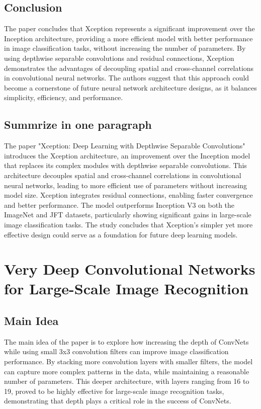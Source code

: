 \documentclass{report}
\begin{document}
	\section{Conclusion}
	The paper concludes that Xception represents a significant improvement over the Inception architecture, providing a more efficient model with better performance in image classification tasks, without increasing the number of parameters. By using depthwise separable convolutions and residual connections, Xception demonstrates the advantages of decoupling spatial and cross-channel correlations in convolutional neural networks. The authors suggest that this approach could become a cornerstone of future neural network architecture designs, as it balances simplicity, efficiency, and performance.
	
	\section{Summrize in one paragraph}
	The paper "Xception: Deep Learning with Depthwise Separable Convolutions" introduces the Xception architecture, an improvement over the Inception model that replaces its complex modules with depthwise separable convolutions. This architecture decouples spatial and cross-channel correlations in convolutional neural networks, leading to more efficient use of parameters without increasing model size. Xception integrates residual connections, enabling faster convergence and better performance. The model outperforms Inception V3 on both the ImageNet and JFT datasets, particularly showing significant gains in large-scale image classification tasks. The study concludes that Xception's simpler yet more effective design could serve as a foundation for future deep learning models.
	
	
	
	
	
	
	\chapter{Very Deep Convolutional Networks for Large-Scale Image Recognition \cite{simonyan2015deepconvolutionalnetworkslargescale}}
	
	\section{Main Idea}
	The main idea of the paper is to explore how increasing the depth of ConvNets while using small 3x3 convolution filters can improve image classification performance. By stacking more convolution layers with smaller filters, the model can capture more complex patterns in the data, while maintaining a reasonable number of parameters. This deeper architecture, with layers ranging from 16 to 19, proved to be highly effective for large-scale image recognition tasks, demonstrating that depth plays a critical role in the success of ConvNets.
	
\end{document}
